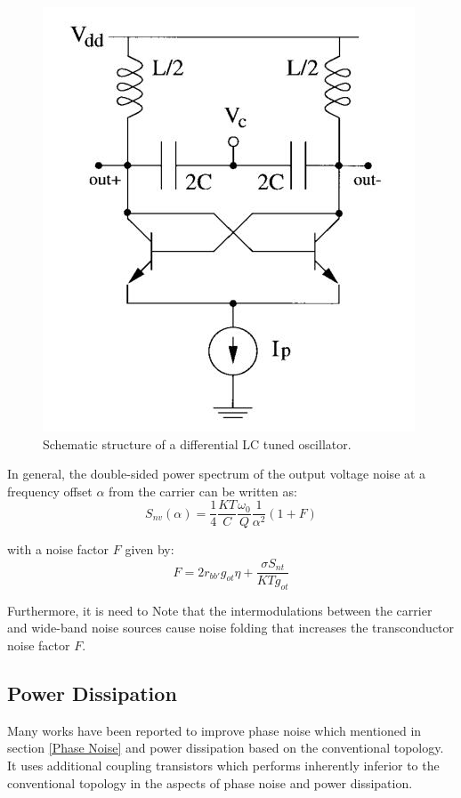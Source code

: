\documentclass[conference]{IEEEtran}
\begin{document}
\begin{figure}[!h]
\centerline{\includegraphics[scale=0.30]{fig/pic3-5.jpg}}
\caption{Schematic structure of a differential LC tuned oscillator.\cite{b1}}
\label{fig3-5}
\end{figure}

In general, the double-sided power spectrum of the output voltage noise at a frequency offset $\alpha$ from the carrier can be written as:
\begin{equation}
S_{nv}(\alpha)=\frac{1}{4}\frac{KT}{C}\frac{\omega_0}{Q}\frac{1}{\alpha^2}(1+F)
\label{eq3-5}
\end{equation}

with a noise factor $F$ given by:
\begin{equation}
F=2r_{bb'} g_{ot} \eta + \frac{\sigma S_{nt}}{KTg_{ot}}
\label{eq3-6}
\end{equation}

Furthermore, it is need to Note that the intermodulations between the carrier and wide-band noise sources cause noise folding that increases the transconductor noise factor $F$.

\subsection{Power Dissipation}
Many works have been reported to improve phase noise which mentioned in section \ref{Phase Noise} and power dissipation based on the conventional topology. It uses additional coupling transistors which performs inherently inferior to the conventional topology in the aspects of phase noise and power dissipation. 
\end{document}

